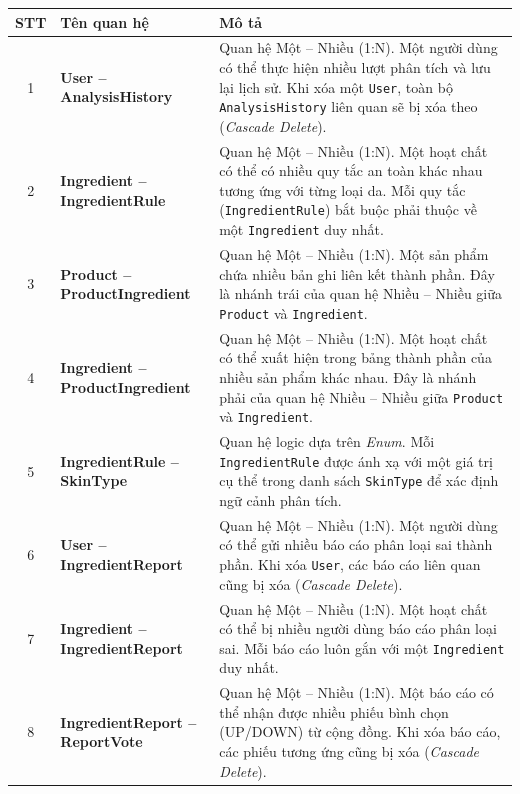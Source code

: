 \documentclass[12pt,a4paper]{article}
\begin{document}
\begin{center}
\renewcommand{\arraystretch}{1.5}
\begin{tabularx}{\textwidth}{|c|l|X|}
\hline
\rowcolor{blue!20}
\textbf{STT} & \textbf{Tên quan hệ} & \textbf{Mô tả} \\ \hline

1 & \textbf{User -- AnalysisHistory} & Quan hệ Một -- Nhiều (1:N). Một người dùng có thể thực hiện nhiều lượt phân tích và lưu lại lịch sử. Khi xóa một \texttt{User}, toàn bộ \texttt{AnalysisHistory} liên quan sẽ bị xóa theo (\textit{Cascade Delete}). \\ \hline

2 & \textbf{Ingredient -- IngredientRule} & Quan hệ Một -- Nhiều (1:N). Một hoạt chất có thể có nhiều quy tắc an toàn khác nhau tương ứng với từng loại da. Mỗi quy tắc (\texttt{IngredientRule}) bắt buộc phải thuộc về một \texttt{Ingredient} duy nhất. \\ \hline

3 & \textbf{Product -- ProductIngredient} & Quan hệ Một -- Nhiều (1:N). Một sản phẩm chứa nhiều bản ghi liên kết thành phần. Đây là nhánh trái của quan hệ Nhiều -- Nhiều giữa \texttt{Product} và \texttt{Ingredient}. \\ \hline

4 & \textbf{Ingredient -- ProductIngredient} & Quan hệ Một -- Nhiều (1:N). Một hoạt chất có thể xuất hiện trong bảng thành phần của nhiều sản phẩm khác nhau. Đây là nhánh phải của quan hệ Nhiều -- Nhiều giữa \texttt{Product} và \texttt{Ingredient}. \\ \hline

5 & \textbf{IngredientRule -- SkinType} & Quan hệ logic dựa trên \textit{Enum}. Mỗi \texttt{IngredientRule} được ánh xạ với một giá trị cụ thể trong danh sách \texttt{SkinType} để xác định ngữ cảnh phân tích. \\ \hline

6 & \textbf{User -- IngredientReport} & Quan hệ Một -- Nhiều (1:N). Một người dùng có thể gửi nhiều báo cáo phân loại sai thành phần. Khi xóa \texttt{User}, các báo cáo liên quan cũng bị xóa (\textit{Cascade Delete}). \\ \hline

7 & \textbf{Ingredient -- IngredientReport} & Quan hệ Một -- Nhiều (1:N). Một hoạt chất có thể bị nhiều người dùng báo cáo phân loại sai. Mỗi báo cáo luôn gắn với một \texttt{Ingredient} duy nhất. \\ \hline

8 & \textbf{IngredientReport -- ReportVote} & Quan hệ Một -- Nhiều (1:N). Một báo cáo có thể nhận được nhiều phiếu bình chọn (UP/DOWN) từ cộng đồng. Khi xóa báo cáo, các phiếu tương ứng cũng bị xóa (\textit{Cascade Delete}). \\ \hline


\end{tabularx}
\end{center}
\end{document}

